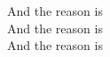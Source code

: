 \songwordfb{} And the reason is  \\
\songwordfb{} And the reason is  \\
\songwordfb{} And the reason is  \\
\songwordfb{}
